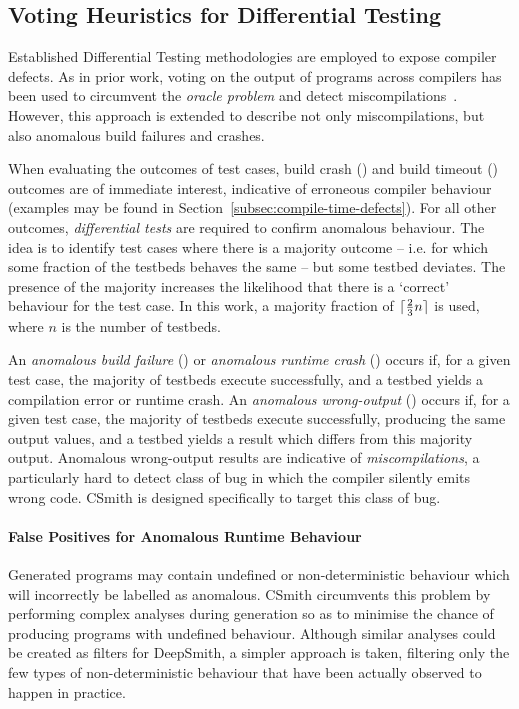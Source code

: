 \subsection{Voting Heuristics for Differential Testing}

Established Differential Testing methodologies are employed to expose compiler defects. As in prior work, voting on the output of programs across compilers has been used to circumvent the \emph{oracle problem} and detect miscompilations~\cite{McKeeman1998}. However, this approach is extended to describe not only miscompilations, but also anomalous build failures and crashes.

When evaluating the outcomes of test cases, build crash (\bc) and build timeout (\bto) outcomes are of immediate interest, indicative of erroneous compiler behaviour (examples may be found in Section~\ref{subsec:compile-time-defects}). For all other outcomes, \emph{differential tests} are required to confirm anomalous behaviour. The idea is to identify test cases where there is a majority outcome -- i.e. for which some fraction of the testbeds behaves the same -- but some testbed deviates. The presence of the majority increases the likelihood that there is a `correct' behaviour for the test case. In this work, a majority fraction of $\lceil\frac{2}{3}n\rceil$ is used, where $n$ is the number of testbeds.

An \emph{anomalous build failure} (\abf) or \emph{anomalous runtime crash} (\arc) occurs if, for a given test case, the majority of testbeds execute successfully, and a testbed yields a compilation error or runtime crash. An \emph{anomalous wrong-output} (\awo) occurs if, for a given test case, the majority of testbeds execute successfully, producing the same output values, and a testbed yields a result which differs from this majority output. Anomalous wrong-output results are indicative of \emph{miscompilations}, a particularly hard to detect class of bug in which the compiler silently emits wrong code. CSmith is designed specifically to target this class of bug.

\paragraph*{False Positives for Anomalous Runtime Behaviour}

Generated programs may contain undefined or non-deterministic behaviour which will incorrectly be labelled as anomalous. CSmith circumvents this problem by performing complex analyses during generation so as to minimise the chance of producing programs with undefined behaviour. Although similar analyses could be created as filters for DeepSmith, a simpler approach is taken, filtering only the few types of non-deterministic behaviour that have been actually observed to happen in practice.

